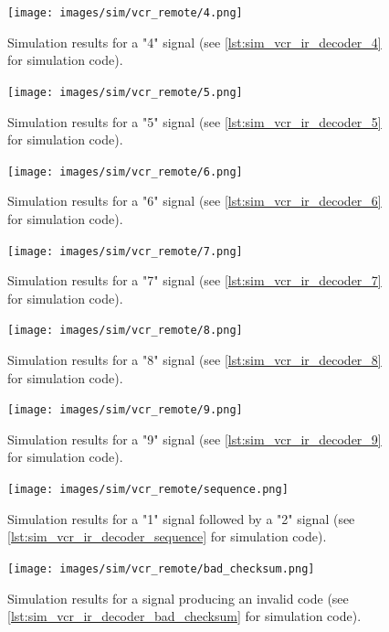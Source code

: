 \documentclass[a4paper]{article}
\begin{document}
\begin{figure}[H]
	\centering
	\texttt{[image: images/sim/vcr\_remote/4.png]}
	\caption{Simulation results for a "4" signal (see \autoref{lst:sim_vcr_ir_decoder_4} for simulation code).}
\end{figure}

\begin{figure}[H]
	\centering
	\texttt{[image: images/sim/vcr\_remote/5.png]}
	\caption{Simulation results for a "5" signal (see \autoref{lst:sim_vcr_ir_decoder_5} for simulation code).}
\end{figure}

\begin{figure}[H]
	\centering
	\texttt{[image: images/sim/vcr\_remote/6.png]}
	\caption{Simulation results for a "6" signal (see \autoref{lst:sim_vcr_ir_decoder_6} for simulation code).}
\end{figure}

\begin{figure}[H]
	\centering
	\texttt{[image: images/sim/vcr\_remote/7.png]}
	\caption{Simulation results for a "7" signal (see \autoref{lst:sim_vcr_ir_decoder_7} for simulation code).}
\end{figure}

\begin{figure}[H]
	\centering
	\texttt{[image: images/sim/vcr\_remote/8.png]}
	\caption{Simulation results for a "8" signal (see \autoref{lst:sim_vcr_ir_decoder_8} for simulation code).}
\end{figure}

\begin{figure}[H]
	\centering
	\texttt{[image: images/sim/vcr\_remote/9.png]}
	\caption{Simulation results for a "9" signal (see \autoref{lst:sim_vcr_ir_decoder_9} for simulation code).}
\end{figure}

\begin{figure}[H]
	\centering
	\texttt{[image: images/sim/vcr\_remote/sequence.png]}
	\caption{Simulation results for a "1" signal followed by a "2" signal (see \autoref{lst:sim_vcr_ir_decoder_sequence} for simulation code).}
\end{figure}

\begin{figure}[H]
	\centering
	\texttt{[image: images/sim/vcr\_remote/bad\_checksum.png]}
	\caption{Simulation results for a signal producing an invalid code (see \autoref{lst:sim_vcr_ir_decoder_bad_checksum} for simulation code).}
\end{figure}
\end{document}
